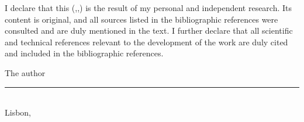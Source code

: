 \makeatletter
I declare that this \MakeLowercase{\thedoctypestr(\iselthesis@opt@docdegree,\iselthesis@opt@doctype,\iselthesis@opt@coverlang)} is the result of my personal and independent research. Its content is original, and all sources listed in the bibliographic references were consulted and are duly mentioned in the text. I further declare that all scientific and technical references relevant to the development of the work are duly cited and included in the bibliographic references.
\makeatother
\begin{center}
The author
\\[3em]

\rule{.5\textwidth}{1pt}
\\[.5em]
\fontsize{10}{12.2}
\selectfont
Lisbon, \thedateday{} \thedatemonth{} \thedateyear
\end{center}

